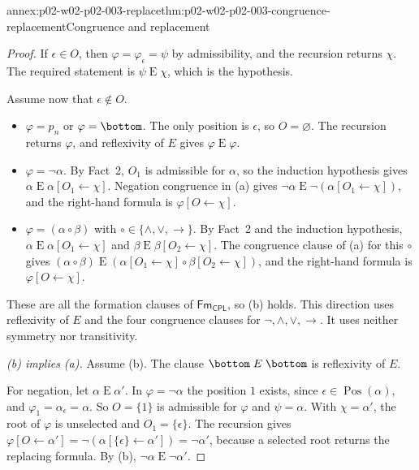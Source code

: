 \begin{annexitem}{annex:p02-w02-p02-003-replace}{thm:p02-w02-p02-003-congruence-replacement}{Congruence and replacement}
\begin{proof}
If \(\epsilon\in O\), then \(\varphi=\varphi_\epsilon=\psi\) by
admissibility, and the recursion returns \(\chi\).  The required statement is
\(\psi\mathrel{E}\chi\), which is the hypothesis.

Assume now that \(\epsilon\notin O\).
\begin{itemize}
  \item \(\varphi=p_n\) or \(\varphi=\bottom\).  The only position is
        \(\epsilon\), so \(O=\varnothing\).  The recursion returns
        \(\varphi\), and reflexivity of \(E\) gives
        \(\varphi\mathrel{E}\varphi\).
  \item \(\varphi=\neg\alpha\).  By Fact~2, \(O_1\) is admissible for
        \(\alpha\), so the induction hypothesis gives
        \(\alpha\mathrel{E}\alpha[O_1\leftarrow\chi]\).  Negation congruence
        in (a) gives
        \(\neg\alpha\mathrel{E}\neg(\alpha[O_1\leftarrow\chi])\), and the
        right-hand formula is \(\varphi[O\leftarrow\chi]\).
  \item \(\varphi=(\alpha\circ\beta)\) with \(\circ\in\{\land,\lor,\to\}\).
        By Fact~2 and the induction hypothesis,
        \(\alpha\mathrel{E}\alpha[O_1\leftarrow\chi]\) and
        \(\beta\mathrel{E}\beta[O_2\leftarrow\chi]\).  The congruence clause
        of (a) for this \(\circ\) gives
        \((\alpha\circ\beta)\mathrel{E}
         (\alpha[O_1\leftarrow\chi]\circ\beta[O_2\leftarrow\chi])\), and the
        right-hand formula is \(\varphi[O\leftarrow\chi]\).
\end{itemize}
These are all the formation clauses of \(\mathsf{Fm}_{\mathsf{CPL}}\), so (b)
holds.  This direction uses reflexivity of \(E\) and the four congruence
clauses for \(\neg,\land,\lor,\to\).  It uses neither symmetry nor
transitivity.

\emph{(b) implies (a).}  Assume (b).  The clause
\(\bottom\mathrel{E}\bottom\) is reflexivity of \(E\).

For negation, let \(\alpha\mathrel{E}\alpha'\).  In \(\varphi=\neg\alpha\)
the position \(1\) exists, since \(\epsilon\in\operatorname{Pos}(\alpha)\),
and \(\varphi_1=\alpha_\epsilon=\alpha\).  So \(O=\{1\}\) is admissible for
\(\varphi\) and \(\psi=\alpha\).  With \(\chi=\alpha'\), the root of
\(\varphi\) is unselected and \(O_1=\{\epsilon\}\).  The recursion gives
\(\varphi[O\leftarrow\alpha']=\neg(\alpha[\{\epsilon\}\leftarrow\alpha'])
=\neg\alpha'\), because a selected root returns the replacing formula.  By
(b), \(\neg\alpha\mathrel{E}\neg\alpha'\).


\end{proof}
\end{annexitem}
